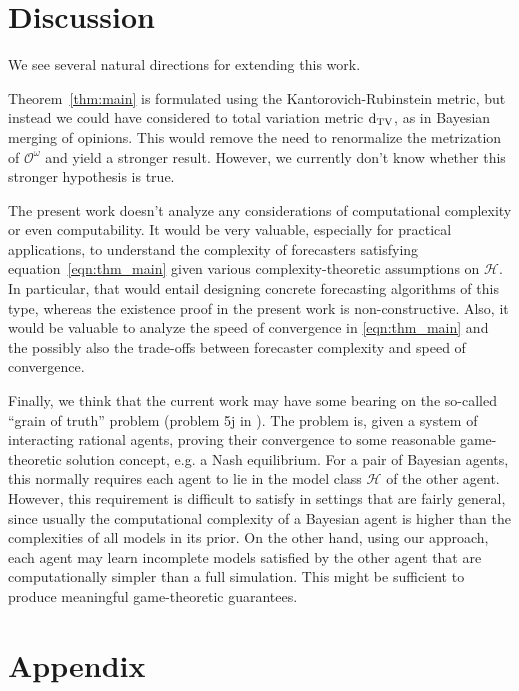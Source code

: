 \documentclass[11pt]{article}
\theoremstyle{definition}
\theoremstyle{plain}
\newcommand{\DTV}{\operatorname{d}_{\textnormal{TV}}}
\newcommand{\Ob}{\mathcal{O}}
\newcommand{\OO}{\Ob^\omega}
\newcommand{\MC}{\mathcal{H}}
\begin{document}
\section{Discussion}

We see several natural directions for extending this work.

Theorem~\ref{thm:main} is formulated using the Kantorovich-Rubinstein metric, but instead we could have considered to total variation metric $\DTV$, as in Bayesian merging of opinions\cite{Blackwell_1962}. This would remove the need to renormalize the metrization of $\OO$ and yield a stronger result. However, we currently don't know whether this stronger hypothesis is true.

The present work doesn't analyze any considerations of computational complexity or even computability. It would be very valuable, especially for practical applications, to understand the complexity of forecasters satisfying equation~\ref{eqn:thm_main} given various complexity-theoretic assumptions on $\MC$. In particular, that would entail designing concrete forecasting algorithms of this type, whereas the existence proof in the present work is non-constructive. Also, it would be valuable to analyze the speed of convergence in \ref{eqn:thm_main} and the possibly also the trade-offs between forecaster complexity and speed of convergence.

Finally, we think that the current work may have some bearing on the so-called \enquote{grain of truth} problem (problem 5j in \cite{Hutter_2009}). The problem is, given a system of interacting rational agents, proving their convergence to some reasonable game-theoretic solution concept, e.g. a Nash equilibrium. For a pair of Bayesian agents, this normally requires each agent to lie in the model class $\MC$ of the other agent. However, this requirement is difficult to satisfy in settings that are fairly general, since usually the computational complexity of a Bayesian agent is higher than the complexities of all models in its prior. On the other hand, using our approach, each agent may learn incomplete models satisfied by the other agent that are computationally simpler than a full simulation. This might be sufficient to produce meaningful game-theoretic guarantees.

\appendix

\section{Appendix}
\end{document}
